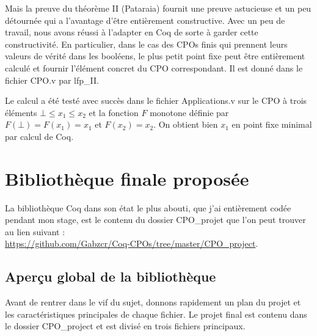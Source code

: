 \documentclass{article}
\newcommand\code[1]{{\fontfamily{lmtt}\selectfont #1}}
\theoremstyle{definition}
\begin{document}
Mais la preuve du théorème II (Pataraia) fournit une preuve astucieuse et un peu détournée qui a l'avantage d'être entièrement constructive. Avec un peu de travail, nous avons réussi à l'adapter en Coq de sorte à garder cette constructivité. En particulier, dans le cas des CPOs finis qui prennent leurs valeurs de vérité dans les booléens, le plus petit point fixe peut être entièrement calculé et fournir l'élément concret du CPO correspondant. Il est donné dans le fichier \code{CPO.v} par \code{lfp\_II}.

Le calcul a été testé avec succès dans le fichier \code{Applications.v} sur le CPO à trois éléments $\bot \leq x_1 \leq x_2$ et la fonction $F$ monotone définie par $F(\bot) = F(x_1) = x_1$ et $F(x_2) = x_2$. On obtient bien $x_1$ en point fixe minimal par calcul de Coq.



\section{Bibliothèque finale proposée}

La bibliothèque Coq dans son état le plus abouti, que j'ai entièrement codée pendant mon stage, est le contenu du dossier \code{CPO\_projet} que l'on peut trouver au lien suivant :\\ \href{https://github.com/Gabzcr/Coq-CPOs/tree/master/CPO\_project}{https://github.com/Gabzcr/Coq-CPOs/tree/master/CPO\_project}.

\subsection{Aperçu global de la bibliothèque}

Avant de rentrer dans le vif du sujet, donnons rapidement un plan du projet et les caractéristiques principales de chaque fichier. Le projet final est contenu dans le dossier \code{CPO\_project} et est divisé en trois fichiers principaux.

\medskip
\end{document}
